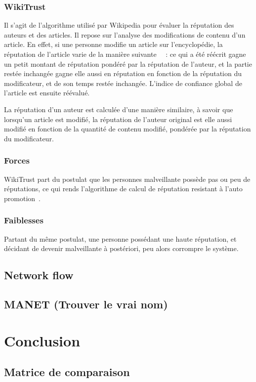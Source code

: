 \documentclass[a4paper, 11pt]{article} %
\begin{document}
\subsubsection{WikiTrust}
Il s'agit de l'algorithme utilisé par Wikipedia pour évaluer la réputation des auteurs et des articles. Il repose sur l'analyse des modifications de contenu d'un article.
En effet, si une personne modifie un article sur l'encyclopédie, la réputation de l'article varie de la manière suivante~\cite{WikiTrust2010}~\cite{WikiTrustSite} :
ce qui a été réécrit gagne un petit montant de réputation pondéré par la réputation de l'auteur,
et la partie restée inchangée gagne elle aussi en réputation en fonction de la réputation du modificateur, et de son temps restée inchangée.
L'indice de confiance global de l'article est ensuite réévalué.

La réputation d'un auteur est calculée d'une manière similaire, à savoir que lorsqu'un article est modifié,
la réputation de l'auteur original est elle aussi modifié en fonction de la quantité de contenu modifié, pondérée par la réputation du modificateur.

\subsubsection{Forces}
WikiTrust part du postulat que les personnes malveillante possède pas ou peu de réputations, ce qui rends l'algorithme de calcul de réputation resistant à l'auto promotion~\cite{Tulungan2013}.

\subsubsection{Faiblesses}
Partant du même postulat, une personne possédant une haute réputation, et décidant de devenir malveillante à postériori, peu alors corrompre le système.

\subsection{Network flow}
\subsection{MANET (Trouver le vrai nom)}

\section{Conclusion}
\subsection{Matrice de comparaison}
\end{document}
